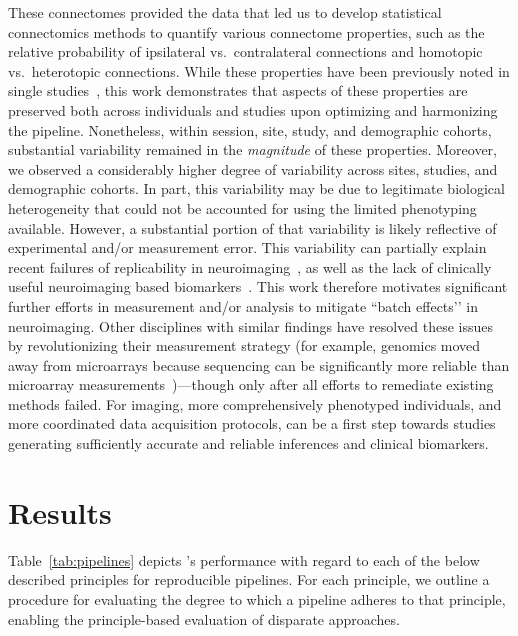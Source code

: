 \documentclass[11pt]{article}
\begin{document}
\begin{multicols}{2}
These connectomes provided the data that led us to develop statistical connectomics methods to quantify various connectome properties, such as the relative probability of ipsilateral vs.~contralateral connections and homotopic vs.~heterotopic connections. While these properties have been previously noted in single studies~\cite{Stark2008,Zuo2010,Gee2011}, this work demonstrates that aspects of these properties are preserved both across individuals and studies upon optimizing and harmonizing the pipeline. Nonetheless, within session, site, study, and demographic cohorts, substantial variability remained in the \emph{magnitude} of these properties. 
Moreover, we observed a considerably higher degree of variability across sites, studies, and demographic cohorts. In part, this variability may be due to legitimate biological heterogeneity that could not be accounted for using the limited phenotyping available. However, a substantial portion of that variability is likely reflective of experimental and/or measurement error.
This variability can partially explain recent failures of replicability in neuroimaging~\cite{Button2013}, as well as the lack of clinically useful neuroimaging based biomarkers~\cite{APA12}. This work therefore motivates significant further efforts in measurement and/or analysis to mitigate ``batch effects’’ in neuroimaging. 
Other disciplines with similar findings have resolved these issues by revolutionizing their measurement strategy (for example, genomics moved away from microarrays because sequencing can be significantly more reliable than microarray measurements~\cite{SEQCMAQC-III_Consortium2014-ij})---though only after all efforts to remediate existing methods failed. For imaging, more comprehensively phenotyped individuals, and more coordinated data acquisition protocols, can be a first step towards studies generating sufficiently accurate and reliable inferences and clinical biomarkers.



%

\section{Results}

Table~\ref{tab:pipelines} depicts \ndmg's performance with regard to each of the below described principles for reproducible pipelines.  
For each principle, we outline a procedure for evaluating the degree to which a pipeline adheres to that principle, enabling the principle-based evaluation of disparate approaches. 


\end{multicols}
\end{document}
